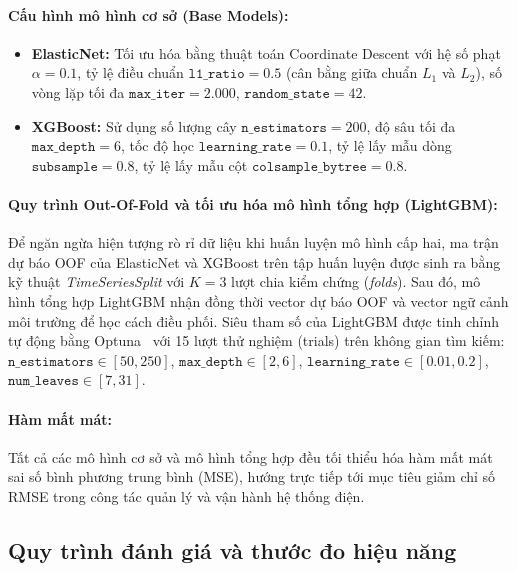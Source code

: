 \paragraph{Cấu hình mô hình cơ sở (Base Models):}
\begin{itemize}
    \item \textbf{ElasticNet:} Tối ưu hóa bằng thuật toán Coordinate Descent với hệ số phạt $\alpha = 0.1$, tỷ lệ điều chuẩn $\texttt{l1\_ratio} = 0.5$ (cân bằng giữa chuẩn $L_1$ và $L_2$), số vòng lặp tối đa $\texttt{max\_iter} = 2.000$, $\texttt{random\_state} = 42$.
    \item \textbf{XGBoost:} Sử dụng số lượng cây $\texttt{n\_estimators} = 200$, độ sâu tối đa $\texttt{max\_depth} = 6$, tốc độ học $\texttt{learning\_rate} = 0.1$, tỷ lệ lấy mẫu dòng $\texttt{subsample} = 0.8$, tỷ lệ lấy mẫu cột $\texttt{colsample\_bytree} = 0.8$.
\end{itemize}

\paragraph{Quy trình Out-Of-Fold và tối ưu hóa mô hình tổng hợp (LightGBM):}
Để ngăn ngừa hiện tượng rò rỉ dữ liệu khi huấn luyện mô hình cấp hai, ma trận dự báo OOF của ElasticNet và XGBoost trên tập huấn luyện được sinh ra bằng kỹ thuật \textit{TimeSeriesSplit} với $K = 3$ lượt chia kiểm chứng (\textit{folds}). Sau đó, mô hình tổng hợp LightGBM nhận đồng thời vector dự báo OOF và vector ngữ cảnh môi trường để học cách điều phối. Siêu tham số của LightGBM được tinh chỉnh tự động bằng Optuna~\cite{akiba2019optuna} với 15 lượt thử nghiệm (trials) trên không gian tìm kiếm: $\texttt{n\_estimators} \in [50, 250]$, $\texttt{max\_depth} \in [2, 6]$, $\texttt{learning\_rate} \in [0.01, 0.2]$, $\texttt{num\_leaves} \in [7, 31]$.

\paragraph{Hàm mất mát:}
Tất cả các mô hình cơ sở và mô hình tổng hợp đều tối thiểu hóa hàm mất mát sai số bình phương trung bình (MSE), hướng trực tiếp tới mục tiêu giảm chỉ số RMSE trong công tác quản lý và vận hành hệ thống điện.

\subsection{Quy trình đánh giá và thước đo hiệu năng}
\label{subsec:evaluation_metrics}

